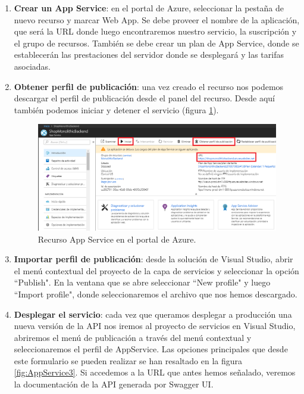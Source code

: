 \documentclass[11pt,spanish,listoffigures]{tfgetsinf}
\begin{document}
\begin{enumerate}
\item \textbf{Crear un App Service}: en el portal de Azure, seleccionar la pestaña de nuevo recurso y marcar Web App. Se debe proveer el nombre de la aplicación, que será la URL donde luego encontraremos nuestro servicio, la suscripción y el grupo de recursos. También se debe crear un plan de App Service, donde se establecerán las prestaciones del servidor donde se desplegará y las tarifas asociadas. 

\item \textbf{Obtener perfil de publicación}: una vez creado el recurso nos podemos descargar el perfil de publicación desde el panel del recurso. Desde aquí también  podemos iniciar y detener el servicio (figura \ref{fig:AppService2}).

\begin{figure}[h]
\centering
\includegraphics[scale=0.6]{AppService2}
\caption{Recurso App Service en el portal de Azure.}
\label{fig:AppService2}
\end{figure}

\item \textbf{Importar perfil de publicación}: desde la solución de Visual Studio, abrir el menú contextual del proyecto de la capa de servicios y seleccionar la opción ``Publish". En la ventana que se abre seleccionar ``New profile" y luego ``Import profile", donde seleccionaremos el archivo que nos hemos descargado.

\item \textbf{Desplegar el servicio}: cada vez que queramos desplegar a producción una nueva versión de la API nos iremos al proyecto de servicios en Visual Studio, abriremos el menú de publicación a través del menú contextual y seleccionaremos el perfil de AppService. Las opciones principales que desde este formulario se pueden realizar se han resaltado en la figura \ref{fig:AppService3}. Si accedemos a la URL que antes hemos señalado, veremos la documentación de la API generada por Swagger UI.


\end{enumerate}
\end{document}

